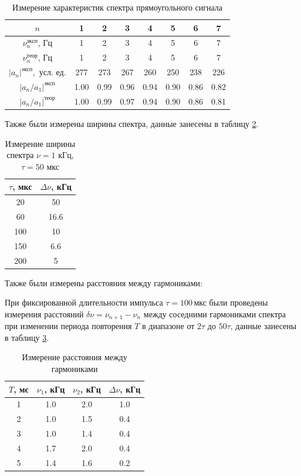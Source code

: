 \documentclass[a4paper]{article}
\begin{document}
\begin{table}[h!]
\centering
\begin{tabular}{|c|c|c|c|c|c|c|c|}
\hline
\( n \) & 1 & 2 & 3 & 4 & 5 & 6 & 7 \\ \hline
\( \nu_n^{\text{эксп}} \), Гц & 1 & 2 & 3 & 4 & 5 & 6 & 7 \\ \hline
\( \nu_n^{\text{теор}} \), Гц & 1 & 2 & 3 & 4 & 5 & 6 & 7 \\ \hline
\( |a_n|^{\text{эксп}}, \text{ усл. ед.} \) & 277 & 273 & 267 & 260 & 250 & 238 & 226 \\ \hline
\( |a_n / a_1|^{\text{эксп}} \) & 1.00 & 0.99 & 0.96 & 0.94 & 0.90 & 0.86 & 0.82 \\ \hline
\( |a_n / a_1|^{\text{теор}} \) & 1.00 & 0.99 & 0.97 & 0.94 & 0.90 & 0.86 & 0.81 \\ \hline
\end{tabular}
\label{table:1}
\caption{Измерение характеристик спектра прямоугольного сигнала}
\end{table}

Также были измерены ширины спектра, данные занесены в таблицу \ref{table:2}.

\begin{table}[h!]
\centering
\caption{Измерение ширины спектра $\nu = 1$ кГц, $\tau = 50$ мкс}
\label{table:2}
\begin{tabular}{|c|c|}
\hline
\( \tau \), мкс & \( \Delta \nu \), кГц \\ \hline
20 & 50 \\ \hline
60 & 16.6 \\ \hline
100 & 10 \\ \hline
150 & 6.6 \\ \hline
200 & 5 \\ \hline
\end{tabular}
\end{table}

Также были измерены расстояния между гармониками:


При фиксированной длительности импульса \( \tau = 100 \, \text{мкс} \) были проведены измерения расстояний \( \delta \nu = \nu_{n+1} - \nu_n \) между соседними гармониками спектра при изменении периода повторения \( T \) в диапазоне от \( 2\tau \) до \( 50\tau \), данные занесены в таблицу \ref{table:3}.

\begin{table}[h!]
\centering
\caption{Измерение расстояния между гармониками}
\label{table:3}
\begin{tabular}{|c|c|c|c|}
\hline
\( T \), мс & \( \nu_1 \), кГц & \( \nu_2 \), кГц & \( \Delta \nu \), кГц \\ \hline
1 & 1.0 & 2.0 & 1.0 \\ \hline
2 & 1.0 & 1.5 & 0.4 \\ \hline
3 & 1.0 & 1.4 & 0.4 \\ \hline
4 & 1.7 & 2.0 & 0.4 \\ \hline
5 & 1.4 & 1.6 & 0.2 \\ \hline
\end{tabular}
\end{table}
\end{document}
